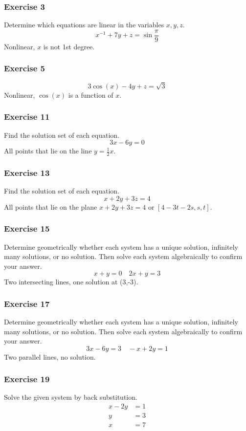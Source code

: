 \documentclass[letterpaper, 12pt]{math}
\begin{document}
\subsubsection*{Exercise 3}
Determine which equations are linear in the variables \( x,y,z \).
\[ x^{-1}+7y+z = \sin\frac{\pi}{9} \]
Nonlinear, \( x \) is not 1st degree.

\subsubsection*{Exercise 5}
\[ 3\cos(x)-4y+z = \sqrt{3} \]
Nonlinear, \( \cos(x) \) is a function of \( x \).

\subsubsection*{Exercise 11}
Find the solution set of each equation.
\[ 3x-6y = 0 \]
All points that lie on the line \( y = \frac{1}{2}x \).

\subsubsection*{Exercise 13}
Find the solution set of each equation.
\[ x+2y+3z = 4 \]
All points that lie on the plane \( x+2y+3z = 4 \) or \( [4-3t-2s,s,t] \).

\subsubsection*{Exercise 15}
Determine geometrically whether each system has a unique solution, infinitely
many solutions, or no solution. Then solve each system algebraically to confirm
your answer.
\[ x+y = 0 \quad 2x+y = 3 \]
Two intersecting lines, one solution at (3,-3).

\subsubsection*{Exercise 17}
Determine geometrically whether each system has a unique solution, infinitely
many solutions, or no solution. Then solve each system algebraically to confirm
your answer.
\[ 3x-6y = 3 \quad -x+2y = 1 \]
Two parallel lines, no solution.

\subsubsection*{Exercise 19}
Solve the given system by back substitution.
\begin{align*}
  x-2y &= 1 \\
  y &= 3 \\
  x &= 7
\end{align*}
\end{document}
